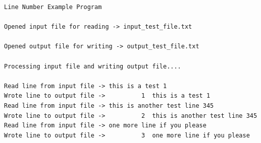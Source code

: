 \begin{verbatim}
Line Number Example Program

Opened input file for reading -> input_test_file.txt           

Opened output file for writing -> output_test_file.txt          

Processing input file and writing output file....

Read line from input file -> this is a test 1                                                                                                                    
Wrote line to output file ->          1  this is a test 1                                                                                                                    
Read line from input file -> this is another test line 345                                                                                                       
Wrote line to output file ->          2  this is another test line 345                                                                                                       
Read line from input file -> one more line if you please                                                                                                         
Wrote line to output file ->          3  one more line if you please
\end{verbatim}